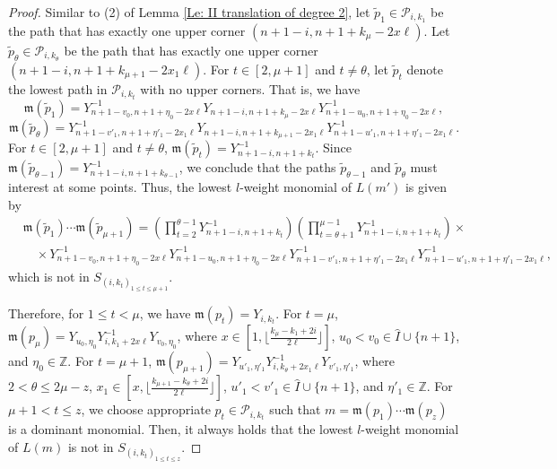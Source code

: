 \documentclass[12pt, reqno]{amsart}
\numberwithin{equation}{section}
\begin{document}
{\begin{proof}
Similar to (2) of Lemma \ref{Le: II translation of degree 2}, let $\widetilde{p}_1\in \mathscr{P}_{i,k_1}$ be the path that has exactly one upper corner $(n+1-i,n+1+k_{\mu}-2x \ell)$. Let $\widetilde{p}_{\theta}\in \mathscr{P}_{i,k_{\theta}}$ be the path that has exactly one upper corner $(n+1-i,n+1+k_{\mu+1}-2x_1 \ell)$. For $t\in[2, \mu+1]$ and $t\neq \theta$, let $\widetilde{p}_t$ denote the lowest path in $\mathscr{P}_{i,k_t}$ with no upper corners. That is, we have 
\[\mathfrak{m}(\widetilde{p}_{1})=Y_{n+1-v_0,n+1+\eta_0-2x \ell}^{-1}Y_{n+1-i,n+1+k_{\mu}-2x \ell}Y_{n+1-u_0, n+1+\eta_0-2x \ell}^{-1},
\]
\[
\mathfrak{m}(\widetilde{p}_{\theta})=Y_{n+1-v'_1,n+1+\eta'_1-2x_1 \ell}^{-1}Y_{n+1-i,n+1+k_{\mu+1}-2x_1 \ell}Y_{n+1-u'_1, n+1+\eta'_1-2x_1 \ell}^{-1}.
\]
For $t\in[2, \mu+1]$ and $t\neq \theta$, $\mathfrak{m}(\widetilde{p}_{t})=Y_{n+1-i,n+1+k_t}^{-1}$. Since $\mathfrak{m}(\widetilde{p}_{\theta-1})=Y_{n+1-i,n+1+k_{\theta-1}}^{-1}$, we conclude that the paths $\widetilde{p}_{\theta-1}$ and $\widetilde{p}_{\theta}$ must interest at some points. Thus, the lowest $l$-weight monomial of $L(m')$ is given by 
\begin{align*}
& \mathfrak{m}(\widetilde{p}_{1})\cdots \mathfrak{m}(\widetilde{p}_{\mu+1})= \left( \prod_{t=2}^{\theta-1}  Y_{n+1-i,n+1+k_{t}}^{-1} \right)\left( \prod_{t=\theta+1}^{\mu-1}Y_{n+1-i,n+1+k_{t}}^{-1} \right) \times \\
& \quad \times Y_{n+1-v_0,n+1+\eta_0-2x \ell}^{-1} Y_{n+1-u_0,n+1+\eta_0-2x \ell}^{-1}  Y_{n+1-v'_1,n+1+\eta'_1-2x_1 \ell}^{-1}Y_{n+1-u'_1,n+1+\eta'_1-2x _1 \ell}^{-1},
\end{align*}
which is not in $S_{(i,k_t)_{1 \leq t \leq \mu+1}}$.

Therefore, for $1\leq t<\mu$, we have $\mathfrak{m}(p_t)=Y_{i,k_t}$. For $t=\mu$, $\mathfrak{m}(p_{\mu})=Y_{u_0,\eta_0}Y_{i,k_1+2x \ell}^{-1}Y_{v_0,\eta_0}$, where $x\in[1,\lfloor\frac{k_\mu-k_1+2i}{2 \ell}\rfloor]$, $u_0<v_0 \in \hat{I} \cup \{n+1\}$, and $\eta_0\in \mathbb{Z}$. For $t=\mu+1$, $\mathfrak{m}(p_{\mu+1})=Y_{u'_1,\eta'_1} Y_{i,k_\theta+2x_1\ell}^{-1}Y_{v'_1,\eta'_1}$, where $2<\theta \leq 2\mu-z$, $x_1\in [x,\lfloor\frac{k_{\mu+1}-k_\theta+2i}{2 \ell}\rfloor]$, $u'_1<v'_1\in \hat{I} \cup \{n+1\}$, and $\eta'_1\in \mathbb{Z}$. For $\mu+1<t\leq z$, we choose appropriate $p_t\in\mathscr{P}_{i,k_t}$ such that $m=\mathfrak{m}(p_1)\cdots \mathfrak{m}(p_z)$ is a dominant monomial. Then, it always holds that the lowest $l$-weight monomial of $L(m)$ is not in $S_{(i,k_t)_{1 \leq t \leq z}}$.


\end{proof}}
\end{document}
